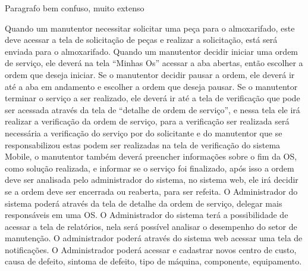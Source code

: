{\color{blue} Paragrafo bem confuso, muito extenso
	 
Quando um manutentor necessitar solicitar uma peça para o almoxarifado, este deve acessar a tela de solicitação de peças e realizar a solicitação, está será enviada para o almoxarifado.
Quando um manutentor decidir iniciar uma ordem de serviço, ele deverá na tela “Minhas Os” acessar a aba abertas, então escolher a ordem que deseja iniciar. Se o manutentor decidir pausar a ordem, ele deverá ir até a aba em andamento e escolher a ordem que deseja pausar.
Se o manutentor terminar o serviço a ser realizado, ele deverá ir até a tela de verificação que pode ser acessada através da tela de “detalhe de ordem de serviço”, e nessa tela ele irá realizar a verificação da ordem de serviço, para a verificação ser realizada será necessária a verificação do serviço por do solicitante e do manutentor que se responsabilizou estas podem ser realizadas na tela de verificação do sistema Mobile, o manutentor também deverá preencher informações sobre o fim da OS, como solução realizada, e informar se o serviço foi finalizado, após isso a ordem deve ser analisada pelo administrador do sistema, no sistema web, ele irá decidir se a ordem deve ser encerrada ou reaberta, para ser refeita.
O Administrador do sistema poderá através da tela de detalhe da ordem de serviço, delegar mais responsáveis em uma OS.
O Administrador do sistema terá a possibilidade de acessar a tela de relatórios, nela será possível analisar o desempenho do setor de manutenção.
O administrador poderá através do sistema web acessar uma tela de notificações.
O Administrador poderá acessar e cadastrar novos centro de custo, causa de defeito,
sintoma de defeito, tipo de máquina, componente, equipamento.

}

